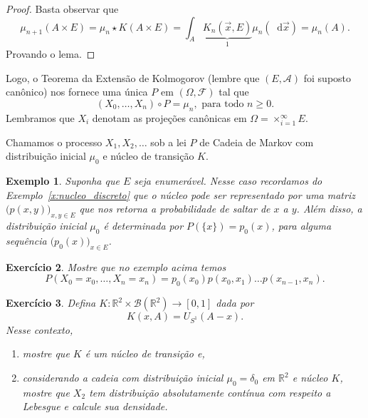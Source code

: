 \documentclass[reqno, draft]{book}
\newcommand*\1{\mathds{1}}
\newtheorem{example}{Exemplo}[section]
\newtheorem{exercise}[example]{Exercício}
\renewcommand*\d{\mathop{}\!\mathrm{d}}
\begin{document}
\begin{proof}
  Basta observar que
  \begin{equation}
    \mu_{n+1}(A \times E) = \mu_n \star K (A \times E) = \int_{A} \underbrace{K_n (\vec{x}, E)}_1 \mu_n(\d \vec{x}) = \mu_n(A).
  \end{equation}
  Provando o lema.
\end{proof}

Logo, o Teorema da Extensão de Kolmogorov (lembre que $(E, \mathcal{A})$ foi suposto canônico) nos fornece uma única $P$ em $(\Omega, \mathcal{F})$ tal que
\begin{equation}
  (X_0, \dots, X_n) \circ P = \mu_n, \text{ para todo $n \geq 0$}.
\end{equation}
Lembramos que $X_i$ denotam as projeções canônicas em $\Omega = \times_{i=1}^\infty E$.

Chamamos o processo $X_1, X_2, \dots$ sob a lei $P$ de Cadeia de Markov  com distribuição inicial $\mu_0$ e núcleo de transição $K$.

\begin{example}
  Suponha que $E$ seja enumerável.
  Nesse caso recordamos do Exemplo~\ref{x:nucleo_discreto} que o núcleo pode ser representado por uma matriz $\big(p(x,y)\big)_{x,y \in E}$ que nos retorna a probabilidade de saltar de $x$ a $y$.
  Além disso, a distribuição inicial $\mu_0$ é determinada por $P(\{x\}) = p_0(x)$, para alguma sequência $\big(p_0(x)\big)_{x \in E}$.
\end{example}

\begin{exercise}
  Mostre que no exemplo acima temos
  \begin{equation}
    P(X_0 = x_0, \dots, X_n = x_n) = p_0(x_0) p(x_0, x_1) \dots p(x_{n-1}, x_n).
  \end{equation}
\end{exercise}

\begin{exercise}
  Defina $K:\mathbb{R}^2 \times \mathcal{B}(\mathbb{R}^2) \to [0,1]$ dada por
  \begin{equation}
    K(x, A) = U_{S^1}(A - x).
  \end{equation}
  Nesse contexto,
  \begin{enumerate}[\quad a)]
  \item mostre que $K$ é um núcleo de transição e,
  \item considerando a cadeia com distribuição inicial $\mu_0 = \delta_0$ em $\mathbb{R}^2$ e núcleo $K$, mostre que $X_2$ tem distribuição absolutamente contínua com respeito a Lebesgue e calcule sua densidade.
  \end{enumerate}
\end{exercise}
\end{document}
